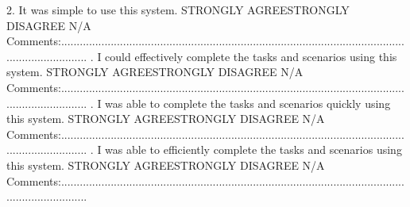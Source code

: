 2. It was simple to use this system.
\newline\newline
STRONGLY AGREE\tab\tab\tab\tab\tab STRONGLY DISAGREE
\newline\newline
{}\tab\tab N/A
\newline\newline
Comments:.........................................................................................................................................
\newline{}. I could effectively complete the tasks and scenarios using this system.
\newline\newline
STRONGLY AGREE\tab\tab\tab\tab\tab STRONGLY DISAGREE
\newline\newline
{}\tab\tab N/A
\newline\newline
Comments:.........................................................................................................................................
\newline{}. I was able to complete the tasks and scenarios quickly using this system.
\newline\newline
STRONGLY AGREE\tab\tab\tab\tab\tab STRONGLY DISAGREE
\newline\newline
{}\tab\tab N/A
\newline\newline
Comments:.........................................................................................................................................
\newline{}. I was able to efficiently complete the tasks and scenarios using this system.
\newline\newline
STRONGLY AGREE\tab\tab\tab\tab\tab STRONGLY DISAGREE
\newline\newline
{}\tab\tab N/A
\newline\newline
Comments:.........................................................................................................................................
